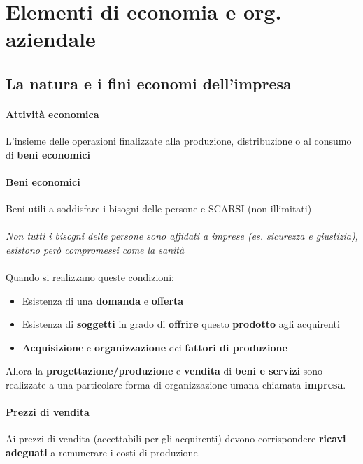 \documentclass[12pt]{article}
\begin{document}
\section{Elementi di economia e org. aziendale}
\subsection{La natura e i fini economi dell'impresa}
\paragraph{Attività economica} L'insieme delle operazioni finalizzate alla produzione, distribuzione o al consumo di \textbf{beni economici}
\paragraph{Beni economici} Beni utili a soddisfare i bisogni delle persone e SCARSI (non illimitati)

\paragraph{}\textit{Non tutti i bisogni delle persone sono affidati a imprese (es. sicurezza e giustizia), esistono però compromessi come la sanità}

\paragraph{} Quando si realizzano queste condizioni:
\begin{itemize}
    \item Esistenza di una \textbf{domanda} e \textbf{offerta}
    \item Esistenza di \textbf{soggetti} in grado di \textbf{offrire} questo \textbf{prodotto} agli acquirenti
    \item \textbf{Acquisizione} e \textbf{organizzazione} dei \textbf{fattori di produzione}
\end{itemize}
Allora la \textbf{progettazione/produzione} e \textbf{vendita} di \textbf{beni e servizi} sono realizzate a una particolare forma di organizzazione umana chiamata \textbf{impresa}.

\paragraph{Prezzi di vendita} Ai prezzi di vendita (accettabili per gli acquirenti) devono corrispondere \textbf{ricavi adeguati} a remunerare i costi di produzione.
\end{document}
